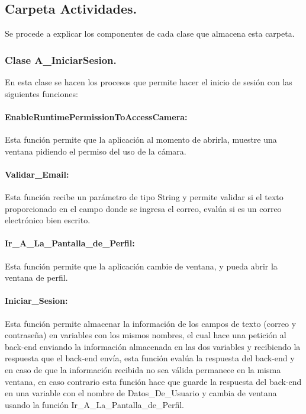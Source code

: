\subsection{Carpeta Actividades.}
Se procede a explicar los componentes de cada clase que almacena esta carpeta.

\subsubsection{Clase A\_IniciarSesion.}
En esta clase se hacen los procesos que permite hacer el inicio de sesión con las siguientes funciones:

\paragraph {EnableRuntimePermissionToAccessCamera:} Esta función permite que la aplicación al momento de abrirla, 
muestre una ventana pidiendo el permiso del uso de la cámara.

\paragraph {Validar\_Email:} Esta función recibe un parámetro de tipo String y permite validar si el texto proporcionado 
en el campo donde se ingresa el correo, evalúa si es un correo electrónico bien escrito.

\paragraph {Ir\_A\_La\_Pantalla\_de\_Perfil:} Esta función permite que la aplicación cambie de ventana, y pueda abrir la ventana de perfil.

\paragraph {Iniciar\_Sesion:} Esta función permite almacenar la información de los campos de texto (correo y contraseña) en variables 
con los mismos nombres, el cual hace una petición al back-end enviando la información almacenada en las dos variables y recibiendo 
la respuesta que el back-end envía, esta función evalúa la respuesta del back-end y en caso de que la información recibida no sea 
válida permanece en la misma ventana, en caso contrario esta función hace que guarde la respuesta del back-end en una variable con 
el nombre de Datos\_De\_Usuario y cambia de ventana usando la función Ir\_A\_La\_Pantalla\_de\_Perfil.


